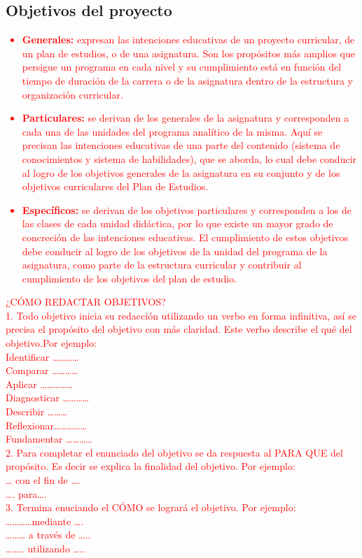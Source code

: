 \documentclass[12pt,letterpaper]{report}
\begin{document}
	\subsection{Objetivos del proyecto}
	\textcolor{red}{
	\begin{itemize}
	\item \textbf{Generales: }expresan las intenciones educativas de un proyecto curricular, de un plan
de estudios, o de una asignatura. Son los propósitos más amplios que persigue un
programa en cada nivel y su cumplimiento está en función del tiempo de duración de
la carrera o de la asignatura dentro de la estructura y organización curricular.
	\item 
	\textbf{Particulares:} se derivan de los generales de la asignatura y corresponden a cada una
de las unidades del programa analítico de la misma. Aquí se precisan las intenciones
educativas de una parte del contenido (sistema de conocimientos y sistema de
habilidades), que se aborda, lo cual debe conducir al logro de los objetivos generales
de la asignatura en su conjunto y de los objetivos curriculares del Plan de Estudios.
	\item 
	\textbf{Específicos:} se derivan de los objetivos particulares y corresponden a los de las clases
de cada unidad didáctica, por lo que existe un mayor grado de concreción de las
intenciones educativas. El cumplimiento de estos objetivos debe conducir al logro de
los objetivos de la unidad del programa de la asignatura, como parte de la estructura
curricular y contribuir al cumplimiento de los objetivos del plan de estudio.
	\end{itemize}	
	¿CÓMO REDACTAR OBJETIVOS?\\
1. Todo objetivo inicia su redacción utilizando un verbo en forma infinitiva, así se
precisa el propósito del objetivo con más claridad. Este verbo describe el qué del
objetivo.Por ejemplo:\\
Identificar …………\\
Comparar …………\\
Aplicar ……………\\
Diagnosticar …………\\
Describir ………\\
Reflexionar……………\\
Fundamentar …………\\
2. Para completar el enunciado del objetivo se da respuesta al PARA QUE del
propósito. Es decir se explica la finalidad del objetivo. Por ejemplo:\\
… con el fin de ….\\
…. para….\\
3. Termina enuciando el CÓMO se logrará el objetivo. Por ejemplo:\\
…………mediante ….\\
……… a través de …..\\
…….. utilizando …..\\
	}
	
\end{document}
